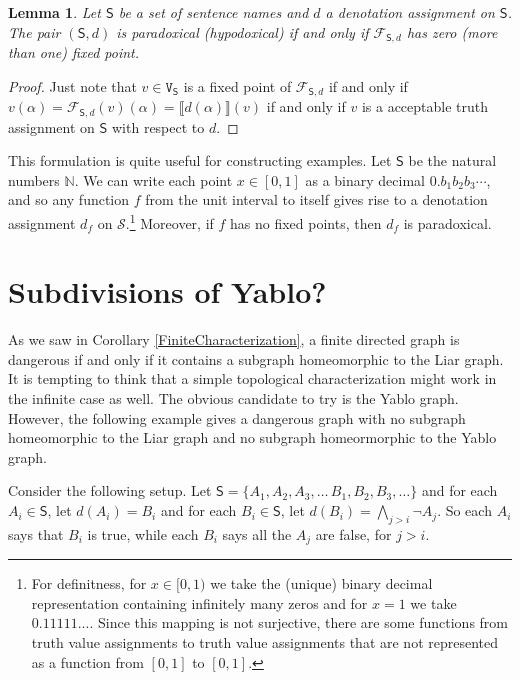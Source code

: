 \documentclass[12pt]{kluwer}
\newtheorem{lem}[thm]{Lemma}
\theoremstyle{remark}
\newcommand{\fancy}[1]{\mathcal{#1}}
\def\S{\textsf{S}}
\def\V{\texttt{V}}
\def\F{\fancy{F}}
\def\F{\fancy{F}}
\begin{document}
\begin{lem}
Let $\S$ be a set of sentence names and $d$ a denotation assignment on $\S$.  The pair $(\S, d)$ is paradoxical (hypodoxical) if and only if $\F_{\S, d}$ has zero (more than one) fixed point.
\end{lem}
\begin{proof}
Just note that $v \in \V_\S$ is a fixed point of $\F_{\S, d}$ if and only if $v(\alpha) = \F_{\S, d}(v)(\alpha) = \llbracket d(\alpha) \rrbracket(v)$ if and only if $v$ is a acceptable truth assignment on $\S$ with respect to $d$.
\end{proof}

This formulation is quite useful for constructing examples.  Let $\S$ be the natural numbers $\mathbb{N}$.  We can write each point $x \in [0,1]$ as a binary decimal $0.b_1b_2b_3\cdots$, and so any function $f$ from the unit interval to itself gives rise to a denotation assignment $d_f$ on $\mathcal{S}$.\footnote{For definitness, for $x \in [0, 1)$ we take the (unique) binary decimal representation containing infinitely many zeros and for $x=1$ we take $0.11111...$.  Since this mapping is not surjective, there are some functions from truth value assignments to truth value assignments that are not represented as a function from $[0, 1]$ to $[0, 1]$.} Moreover, if $f$ has no fixed points, then $d_f$ is paradoxical. \newline


\section{Subdivisions of Yablo?}
\label{subdiv}

As we saw in Corollary \ref{FiniteCharacterization}, a finite directed graph is dangerous if and only if it contains a subgraph homeomorphic to the Liar graph.  It is tempting to think that a simple topological characterization might work in the infinite case as well.  The obvious candidate to try is the Yablo graph.  However, the following example gives a dangerous graph with no subgraph homeomorphic to the Liar graph and no subgraph homeormorphic to the Yablo graph.\newline

Consider the following setup. Let $\S = \{A_1, A_2, A_3, \dots\, B_1, B_2, B_3, \dots\}$ and for each $A_i \in \S$, let $d(A_i) = B_i$ and for each $B_i \in \S$, let $d(B_i) = \bigwedge_{j > i} \neg A_j$. So each $A_i$ says that $B_i$ is true, while each $B_i$ says all the $A_j$ are false, for $j>i$.
 
\end{document}
